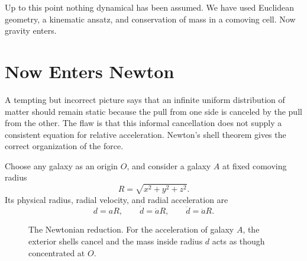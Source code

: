 Up to this point nothing dynamical has been assumed. We have used Euclidean geometry, a kinematic ansatz, and conservation of mass in a comoving cell. Now gravity enters.

\section{Now Enters Newton}

A tempting but incorrect picture says that an infinite uniform distribution of matter should remain static because the pull from one side is canceled by the pull from the other. The flaw is that this informal cancellation does not supply a consistent equation for relative acceleration. Newton's shell theorem gives the correct organization of the force.

Choose any galaxy as an origin \(O\), and consider a galaxy \(A\) at fixed comoving radius
\begin{equation}
R=\sqrt{x^2+y^2+z^2}.
\end{equation}
Its physical radius, radial velocity, and radial acceleration are
\begin{equation}
d=aR,
\qquad
\dot d=\dot a R,
\qquad
\ddot d=\ddot a R.
\label{eq:c01-radial-kinematics}
\end{equation}

\begin{figure}[ht]
\centering
{}
\caption{The Newtonian reduction. For the acceleration of galaxy \(A\), the exterior shells cancel and the mass inside radius \(d\) acts as though concentrated at \(O\).}
\label{fig:c01-newton-sphere}
\end{figure}

